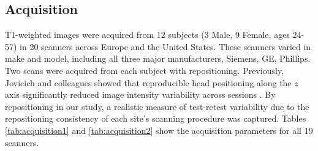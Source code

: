\subsection{Acquisition}
T1-weighted images were acquired from 12 subjects (3 Male, 9 Female, ages 24-57) in 20 scanners across Europe and the United States. These scanners varied in make and model, including all three major manufacturers, Siemens, GE, Phillips. Two scans were acquired from each subject with repositioning. Previously, Jovicich and colleagues showed that reproducible head positioning along the $z$ axis significantly reduced image intensity variability across sessions \cite{freesurferReliability}. By repositioning in our study, a realistic measure of test-retest variability due to the repositioning consistency of each site's scanning procedure was captured. Tables \ref{tab:acquisition1} and \ref{tab:acquisition2} show the acquisition parameters for all 19 scanners.